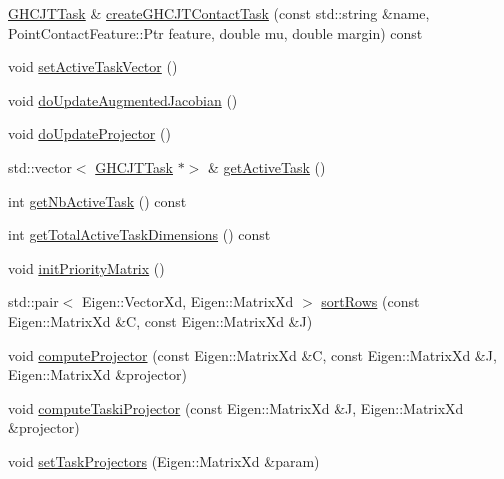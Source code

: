 \begin{DoxyCompactItemize}
\item 
\hyperlink{classgocra_1_1GHCJTTask}{G\+H\+C\+J\+T\+Task} \& \hyperlink{classgocra_1_1GHCJTController_aefa4677e1ee240157074bfc166d030c1}{create\+G\+H\+C\+J\+T\+Contact\+Task} (const std\+::string \&name, Point\+Contact\+Feature\+::\+Ptr feature, double mu, double margin) const
\item 
void \hyperlink{classgocra_1_1GHCJTController_aaee75cf0731450ec268d0dbcfb3504c3}{set\+Active\+Task\+Vector} ()
\item 
void \hyperlink{classgocra_1_1GHCJTController_ad15bf75052d51753ba0454e040dac8dc}{do\+Update\+Augmented\+Jacobian} ()
\item 
void \hyperlink{classgocra_1_1GHCJTController_a5d54c1726d3b72f04f0a1e9cffd91bde}{do\+Update\+Projector} ()
\item 
std\+::vector$<$ \hyperlink{classgocra_1_1GHCJTTask}{G\+H\+C\+J\+T\+Task} $\ast$$>$ \& \hyperlink{classgocra_1_1GHCJTController_a159c5708a2da97b1b8669a6dc586f8bf}{get\+Active\+Task} ()
\item 
int \hyperlink{classgocra_1_1GHCJTController_a9c72545e3995937ae9448428ccce210b}{get\+Nb\+Active\+Task} () const
\item 
int \hyperlink{classgocra_1_1GHCJTController_a7089de05269c8d2ded61640d3ae485b1}{get\+Total\+Active\+Task\+Dimensions} () const
\item 
void \hyperlink{classgocra_1_1GHCJTController_a259208518d68271b441369d1538fe362}{init\+Priority\+Matrix} ()
\item 
std\+::pair$<$ Eigen\+::\+Vector\+Xd, Eigen\+::\+Matrix\+Xd $>$ \hyperlink{classgocra_1_1GHCJTController_a5ef80e1ba5c3b2d14352fe06ba7b20e4}{sort\+Rows} (const Eigen\+::\+Matrix\+Xd \&C, const Eigen\+::\+Matrix\+Xd \&J)
\item 
void \hyperlink{classgocra_1_1GHCJTController_ab06ee2982ac337cdad4d11fe2a570e94}{compute\+Projector} (const Eigen\+::\+Matrix\+Xd \&C, const Eigen\+::\+Matrix\+Xd \&J, Eigen\+::\+Matrix\+Xd \&projector)
\item 
void \hyperlink{classgocra_1_1GHCJTController_a7c544e46be7f415675f68f3c4fe6be93}{compute\+Taski\+Projector} (const Eigen\+::\+Matrix\+Xd \&J, Eigen\+::\+Matrix\+Xd \&projector)
\item 
void \hyperlink{classgocra_1_1GHCJTController_a517d7603b3506a09ec7c5ed9b22bd7a9}{set\+Task\+Projectors} (Eigen\+::\+Matrix\+Xd \&param)
\end{DoxyCompactItemize}
